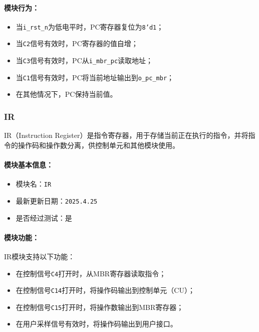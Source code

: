 \documentclass[lang=cn,a4paper,newtx]{elegantpaper}
\begin{document}
\paragraph{模块行为：}
\begin{itemize}
  \item 当\texttt{i\_rst\_n}为低电平时，PC寄存器复位为\texttt{8'd1}；
  \item 当\texttt{C2}信号有效时，PC寄存器的值自增；
  \item 当\texttt{C3}信号有效时，PC从\texttt{i\_mbr\_pc}读取地址；
  \item 当\texttt{C1}信号有效时，PC将当前地址输出到\texttt{o\_pc\_mbr}；
  \item 在其他情况下，PC保持当前值。
\end{itemize}
\subsubsection{IR}
IR（Instruction Register）是指令寄存器，用于存储当前正在执行的指令，并将指令的操作码和操作数分离，供控制单元和其他模块使用。

\paragraph{模块基本信息：}
\begin{itemize}
  \item 模块名：\texttt{IR}
  \item 最新更新日期：\texttt{2025.4.25}
  \item 是否经过测试：是
\end{itemize}

\paragraph{模块功能：}
IR模块支持以下功能：
\begin{itemize}
  \item 在控制信号\texttt{C4}打开时，从MBR寄存器读取指令；
  \item 在控制信号\texttt{C14}打开时，将操作码输出到控制单元（CU）；
  \item 在控制信号\texttt{C15}打开时，将操作数输出到MBR寄存器；
  \item 在用户采样信号有效时，将操作码输出到用户接口。
\end{itemize}
\end{document}
